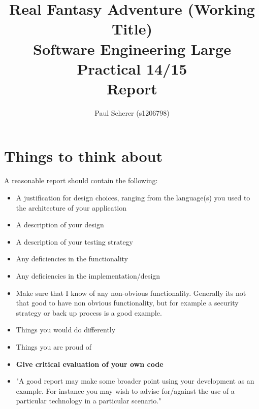 \documentclass[11pt,a4paper]{article}
\begin{document}
\title{Real Fantasy Adventure (Working Title) \\
Software Engineering Large Practical 14/15 \\
Report}
\author{Paul Scherer (s1206798)}
\maketitle
\newpage

\tableofcontents
\newpage

\section{Things to think about}
A reasonable report should contain the following:
\begin{itemize}
\item A justification for design choices, ranging from the language(s) you used to the architecture of your application
\item A description of your design
\item A description of your testing strategy
\item Any deficiencies in the functionality
\item Any deficiencies in the implementation/design
\item Make sure that I know of any non-obvious functionality. Generally its not that good to have non obvious functionality, but for example a security strategy or back up process is a good example.
\item Things you would do differently
\item Things you are proud of
\item \textbf{Give critical evaluation of your own code}
\item "A good report may make some broader point using your development as an example. For instance you may wish to advise for/against the use of a particular technology in a particular scenario."

\end{itemize}
\end{document}
